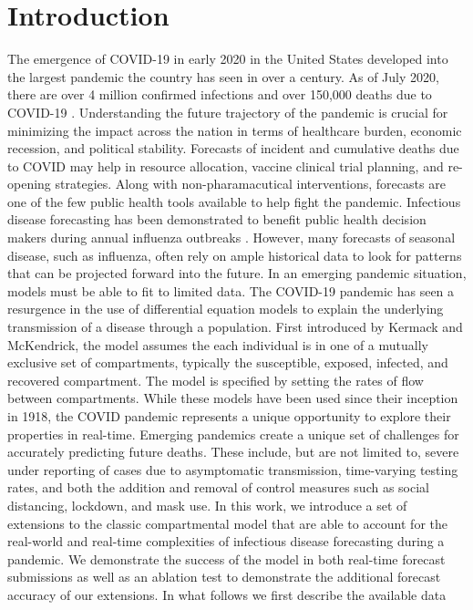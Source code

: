 \documentclass[11pt]{amsart}
\begin{document}
\maketitle


\section{Introduction}

The emergence of COVID-19 in early 2020 in the United States developed into the largest pandemic the country has seen in over a century. As of July 2020, there are over 4 million confirmed infections and over 150,000 deaths due to COVID-19 \cite{dong2020interactive}.  Understanding the future trajectory of the pandemic is crucial for minimizing the impact across the nation in terms of healthcare burden, economic recession, and political stability. Forecasts of incident and cumulative deaths due to COVID may help in resource allocation, vaccine clinical trial planning, and re-opening strategies. Along with non-pharamacutical interventions, forecasts are one of the few public health tools available to help fight the pandemic. Infectious disease forecasting has been demonstrated to benefit public health decision makers during annual influenza outbreaks \cite{lutz2019applying}.  However, many forecasts of seasonal disease, such as influenza, often rely on ample historical data to look for patterns that can be projected forward into the future. In an emerging pandemic situation, models must be able to fit to limited data. The COVID-19 pandemic has seen a resurgence in the use of differential equation models to explain the underlying transmission of a disease through a population. First introduced by  Kermack and McKendrick, the model assumes the each individual is in one of a mutually exclusive set of compartments, typically the susceptible, exposed, infected, and recovered compartment. The model is specified by setting the rates of flow between compartments. While these models have been used since their inception in 1918, the COVID pandemic represents a unique opportunity to explore their properties in real-time. Emerging pandemics create a unique set of challenges for accurately predicting future deaths. These include, but are not limited to, severe under reporting of cases due to asymptomatic transmission, time-varying testing rates, and both the addition and removal of control measures such as social distancing, lockdown, and mask use. In this work, we introduce a set of extensions to the classic compartmental model that are able to account for the real-world and real-time complexities of infectious disease forecasting during a pandemic. We demonstrate the success of the model in both real-time forecast submissions  as well as an ablation test to demonstrate the additional forecast accuracy of our extensions. In what follows we first describe the available data 
\end{document}
